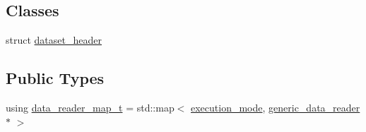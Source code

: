\subsection*{Classes}
\begin{DoxyCompactItemize}
\item 
struct \hyperlink{structlbann_1_1generic__input__layer_1_1dataset__header}{dataset\+\_\+header}
\end{DoxyCompactItemize}
\subsection*{Public Types}
\begin{DoxyCompactItemize}
\item 
using \hyperlink{classlbann_1_1generic__input__layer_a6c3b901ea25ff3bba052cb3e14df4f83}{data\+\_\+reader\+\_\+map\+\_\+t} = std\+::map$<$ \hyperlink{base_8hpp_a2781a159088df64ed7d47cc91c4dc0a8}{execution\+\_\+mode}, \hyperlink{classlbann_1_1generic__data__reader}{generic\+\_\+data\+\_\+reader} $\ast$ $>$
\end{DoxyCompactItemize}
